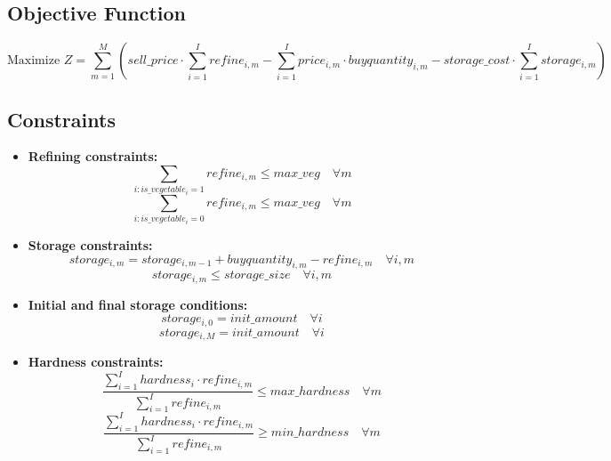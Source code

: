 \documentclass{article}
\begin{document}
\subsection*{Objective Function}
\[
\text{Maximize } Z = \sum_{m=1}^{M} \left( sell\_price \cdot \sum_{i=1}^{I} refine_{i,m} - \sum_{i=1}^{I} price_{i,m} \cdot buyquantity_{i,m} - storage\_cost \cdot \sum_{i=1}^{I} storage_{i,m} \right)
\]

\subsection*{Constraints}
\begin{itemize}
    \item \textbf{Refining constraints:}
    \[
    \sum_{i: is\_vegetable_{i}=1} refine_{i,m} \leq max\_veg \quad \forall m
    \]
    \[
    \sum_{i: is\_vegetable_{i}=0} refine_{i,m} \leq max\_veg \quad \forall m
    \]
    
    \item \textbf{Storage constraints:}
    \[
    storage_{i,m} = storage_{i,m-1} + buyquantity_{i,m} - refine_{i,m} \quad \forall i, m
    \]
    \[
    storage_{i,m} \leq storage\_size \quad \forall i, m
    \]
    
    \item \textbf{Initial and final storage conditions:}
    \[
    storage_{i,0} = init\_amount \quad \forall i
    \]
    \[
    storage_{i,M} = init\_amount \quad \forall i
    \]

    \item \textbf{Hardness constraints:}
    \[
    \frac{\sum_{i=1}^{I} hardness_{i} \cdot refine_{i,m}}{\sum_{i=1}^{I} refine_{i,m}} \leq max\_hardness \quad \forall m
    \]
    \[
    \frac{\sum_{i=1}^{I} hardness_{i} \cdot refine_{i,m}}{\sum_{i=1}^{I} refine_{i,m}} \geq min\_hardness \quad \forall m
    \]
\end{itemize}
\end{document}
